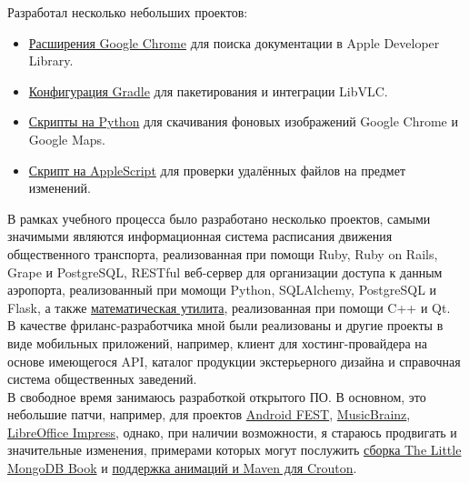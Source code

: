      Разработал несколько небольших проектов:

      \begin{itemize}

        \item \href{для://github.com/ming13/apple-developer-library-search-extensions}{Расширения Google Chrome}
          для поиска документации в Apple Developer Library.

        \item \href{https://github.com/ming13/libvlc-android}{Конфигурация Gradle}
          для пакетирования и интеграции LibVLC.

        \item \href{https://github.com/ming13/google-wallpaper-downloaders}{Скрипты на Python}
          для скачивания фоновых изображений Google Chrome и Google Maps.

        \item \href{https://github.com/ming13/watchdog}{Скрипт на AppleScript}
          для проверки удалённых файлов на предмет изменений.

      \end{itemize}

      В рамках учебного процесса было разработано несколько проектов,
      самыми значимыми являются
      информационная система расписания движения общественного транспорта,
      реализованная при помощи Ruby, Ruby on Rails, Grape и PostgreSQL,
      RESTful веб-сервер для организации доступа к данным аэропорта, реализованный
      при момощи Python, SQLAlchemy, PostgreSQL и Flask, а также
      \href{https://github.com/ming13/aequatio}{математическая утилита},
      реализованная при помощи C++ и Qt. \\

      В качестве фриланс-разработчика
      мной были реализованы и другие проекты в виде мобильных приложений,
      например, клиент для хостинг-провайдера на основе имеющегося API,
      каталог продукции экстерьерного дизайна и справочная система
      общественных заведений. \\

      В свободное время занимаюсь разработкой открытого ПО.
      В основном, это небольшие патчи, например, для проектов
      \href{https://github.com/square/fest-android/commits?author=ming13}{Android FEST},
      \href{https://github.com/jdamcd/musicbrainz-android/commits?author=ming13}{MusicBrainz},
      \href{https://gerrit.libreoffice.org/#/q/owner:%22Artur+Dryomov%22+status:closed,n,z}{LibreOffice Impress},
      однако, при наличии возможности, я стараюсь продвигать и значительные изменения, примерами
      которых могут послужить
      \href{https://github.com/karlseguin/the-little-mongodb-book/pull/16}{сборка The Little MongoDB Book} и
      \href{https://github.com/keyboardsurfer/Crouton/pulls/ming13?state=closed}{поддержка анимаций и Maven для Crouton}.


